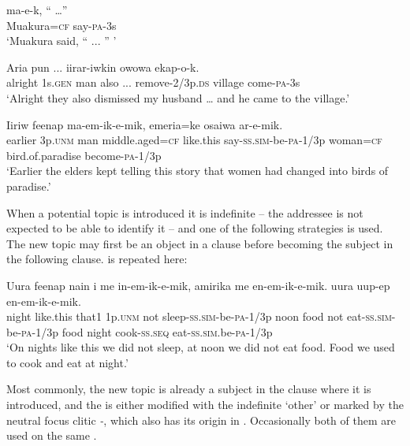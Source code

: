 \ea%
\label{ex:x1664}
\gll {}  ma-e-k,  ``  {\dots''} \\
Muakura=\textsc{cf}  say-\textsc{pa}-3s      \\
\glt`Muakura said, `` ... '' '
\z


\ea%
\label{ex:x1665}
\gll Aria    pun  ...  iirar-iwkin  owowa  ekap-o-k. \\
alright  1s.\textsc{gen}  man  also  ...  remove-2/3p.\textsc{ds}  village  come-\textsc{pa}-3s      \\
\glt`Alright they also dismissed my husband {\dots} and he came to the village.'
\z


\ea%
\label{ex:x1667}
\gll Iiriw      feenap ma-em-ik-e-mik,  emeria=ke  osaiwa  ar-e-mik. \\
earlier  3p.\textsc{unm}  man  middle.aged=\textsc{cf}  like.this say-\textsc{ss}.\textsc{sim}-be-\textsc{pa}-1/3p  woman=\textsc{cf}  bird.of.paradise  become-\textsc{pa}-1/3p    \\
\glt`Earlier the elders kept telling this story that women had changed into birds of paradise.'
\z


When a potential topic is introduced it is indefinite -- the addressee is not expected to be able to identify it -- and one of the following strategies is used. The new topic may  first be an object in a clause before becoming the subject in the following clause.  is repeated here: 

\ea%
\label{ex:x1668}
\gll Uura  feenap  nain  i  me  in-em-ik-e-mik, amirika    me  en-em-ik-e-mik.   uura  uup-ep  en-em-ik-e-mik.\\
night  like.this  that1  1p.\textsc{unm}  not  sleep-\textsc{ss}.\textsc{sim}-be-\textsc{pa}-1/3p noon  food  not  eat-\textsc{ss}.\textsc{sim}-be-\textsc{pa}-1/3p food  night  cook-\textsc{ss}.\textsc{seq}  eat-\textsc{ss}.\textsc{sim}.be-\textsc{pa}-1/3p    \\
\glt`On nights like this we did not sleep, at noon we did not eat food. Food we used to cook and eat at night.'
\z


Most commonly, the new topic is already a subject in the clause where it is introduced, and the  is either modified with the indefinite  `other' or marked by the neutral focus clitic \textit{-}, which also has its origin in . Occasionally both of them are used on the same  . 

